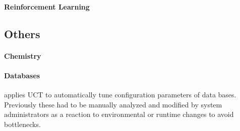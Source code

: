 \paragraph{Reinforcement Learning}
\subsection{Others}
\paragraph{Chemistry}
\cite{yang2019concepts}
\paragraph{Databases}
\cite{omondi2019monte} applies UCT to automatically tune configuration parameters of data bases. Previously these had to be manually analyzed and modified by system administrators as a reaction to environmental or runtime changes to avoid bottlenecks. 
